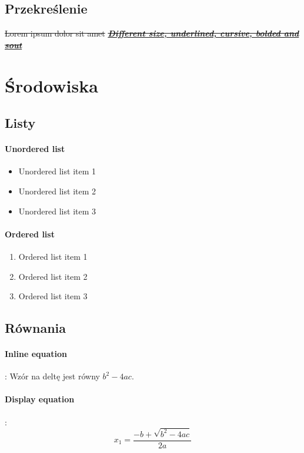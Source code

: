 \documentclass{article}
\begin{document}
\subsection{Przekreślenie}
\sout{Lorem ipsum dolor sit amet}
\newline
\textbf{\underline{\textit{\sout{{\LARGE Different size, underlined, cursive, bolded and sout}}}}}

\section{Środowiska}
\subsection{Listy}
\paragraph{Unordered list}
\begin{itemize}
    \item Unordered list item 1
    \item Unordered list item 2
    \item Unordered list item 3
 \end{itemize}
 
 \paragraph{Ordered list}
 \begin{enumerate}
    \item Ordered list item 1
    \item Ordered list item 2
    \item Ordered list item 3
 \end{enumerate}
 
\subsection{Równania}
\paragraph{Inline equation}: 
Wzór na deltę jest równy $b^2-4ac$.

\paragraph{Display equation}:
\begin{equation*}
x_1 = \frac{-b + \sqrt{b^2 - 4ac}}{2a}
\end{equation*}
\end{document}
